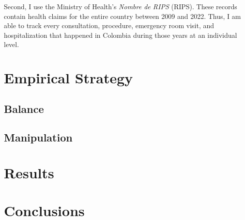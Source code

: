 \documentclass[12pt, a4paper]{article}
\begin{document}
Second, I use the Ministry of Health's \textit{Nombre de RIPS} (RIPS). These records contain health claims for the entire country between 2009 and 2022. Thus, I am able to track every consultation, procedure, emergency room visit, and hospitalization that happened in Colombia during those years at an individual level.

\section{Empirical Strategy \label{sec:strategy}}

\subsection{Balance}

\subsection{Manipulation}

\section{Results}


\section{Conclusions}

\newpage


\end{document}

